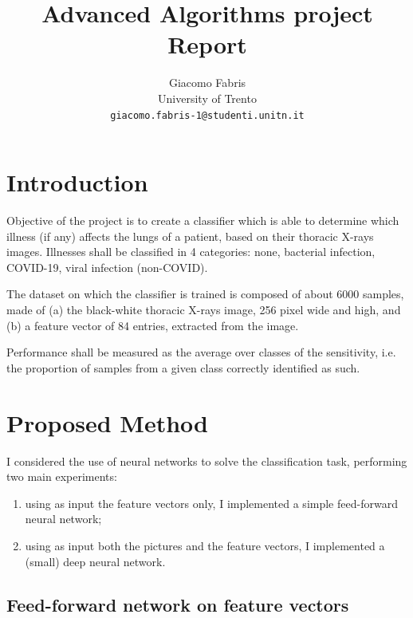 \documentclass[10pt,a4paper]{article}
\begin{document}
\title{\textsf{Advanced Algorithms project Report}}

\author{Giacomo Fabris\\
University of Trento\\
{\tt\small giacomo.fabris-1@studenti.unitn.it}
}

\maketitle

\section{Introduction}

Objective of the project is to create a classifier which is able to determine which illness (if any) affects the lungs of a patient, based on their thoracic X-rays images. Illnesses shall be classified in 4 categories: none, bacterial infection, COVID-19, viral infection (non-COVID).

The dataset on which the classifier is trained is composed of about 6000 samples, made of (a) the black-white thoracic X-rays image, 256 pixel wide and high, and (b) a feature vector of 84 entries, extracted from the image.

Performance shall be measured as the average over classes of the sensitivity, i.e. the proportion of samples from a given class correctly identified as such. 

\section{Proposed Method}

I considered the use of neural networks to solve the classification task, performing two main experiments:
\begin{enumerate}
    \item using as input the feature vectors only, I implemented a simple feed-forward neural network;
    \item using as input both the pictures and the feature vectors, I implemented a (small) deep neural network.
\end{enumerate}

\subsection{Feed-forward network on feature vectors}
\end{document}
